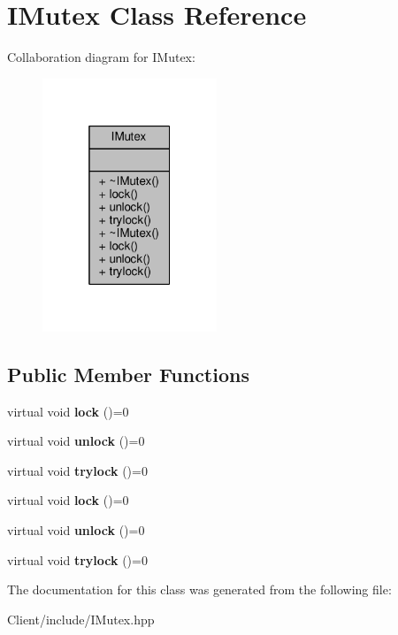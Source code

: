 \hypertarget{class_i_mutex}{}\section{I\+Mutex Class Reference}
\label{class_i_mutex}


Collaboration diagram for I\+Mutex\+:\nopagebreak
\begin{figure}[H]
\begin{center}
\leavevmode
\includegraphics[width=148pt]{d6/d6b/class_i_mutex__coll__graph}
\end{center}
\end{figure}
\subsection*{Public Member Functions}
\begin{DoxyCompactItemize}
\item 
virtual void {\bfseries lock} ()=0\hypertarget{class_i_mutex_ab7ba4deb502ef51a604b7a4d154373c0}{}\label{class_i_mutex_ab7ba4deb502ef51a604b7a4d154373c0}

\item 
virtual void {\bfseries unlock} ()=0\hypertarget{class_i_mutex_ae73a150e6fb18e7553288dd228ddff96}{}\label{class_i_mutex_ae73a150e6fb18e7553288dd228ddff96}

\item 
virtual void {\bfseries trylock} ()=0\hypertarget{class_i_mutex_a463db1f9a4e32c64197a71855b0a1eec}{}\label{class_i_mutex_a463db1f9a4e32c64197a71855b0a1eec}

\item 
virtual void {\bfseries lock} ()=0\hypertarget{class_i_mutex_ab7ba4deb502ef51a604b7a4d154373c0}{}\label{class_i_mutex_ab7ba4deb502ef51a604b7a4d154373c0}

\item 
virtual void {\bfseries unlock} ()=0\hypertarget{class_i_mutex_ae73a150e6fb18e7553288dd228ddff96}{}\label{class_i_mutex_ae73a150e6fb18e7553288dd228ddff96}

\item 
virtual void {\bfseries trylock} ()=0\hypertarget{class_i_mutex_a463db1f9a4e32c64197a71855b0a1eec}{}\label{class_i_mutex_a463db1f9a4e32c64197a71855b0a1eec}

\end{DoxyCompactItemize}


The documentation for this class was generated from the following file\+:\begin{DoxyCompactItemize}
\item 
Client/include/I\+Mutex.\+hpp\end{DoxyCompactItemize}
